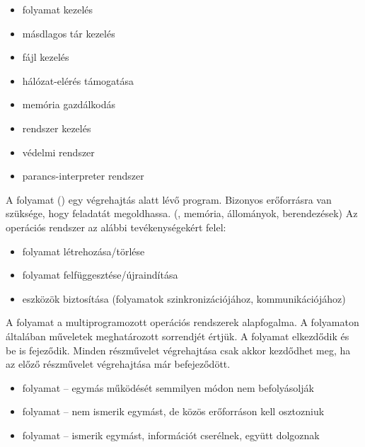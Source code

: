 \documentclass[main.tex]{subfiles}
\begin{document}
  \begin{minipage}[t]{0.5\textwidth}
    \begin{itemize}
      \item folyamat kezelés
      \item másdlagos tár kezelés
      \item fájl kezelés
      \item hálózat-elérés támogatása
    \end{itemize}
  \end{minipage}\hfill
  \begin{minipage}[t]{0.5\textwidth}
    \begin{itemize}
      \item memória gazdálkodás
      \item {} rendszer kezelés
      \item védelmi rendszer
      \item parancs-interpreter rendszer
    \end{itemize}
  \end{minipage}\hfill
  


  A folyamat () egy végrehajtás alatt lévő program.
  Bizonyos erőforrásra van szüksége, hogy feladatát megoldhassa.
  (, memória, állományok,  berendezések)
  Az operációs rendszer az alábbi tevékenységekért felel:
  \begin{itemize}
    \item folyamat létrehozása/törlése
    \item folyamat felfüggesztése/újraindítása
    \item eszközök biztosítása
    (folyamatok szinkronizációjához, kommunikációjához)
  \end{itemize}
  A folyamat a multiprogramozott operációs rendszerek alapfogalma.
  A folyamaton általában műveletek meghatározott sorrendjét értjük.
  A folyamat elkezdődik és be is fejeződik.
  Minden részművelet végrehajtása csak akkor kezdődhet meg,
  ha az előző részművelet végrehajtása már befejeződött.
  \begin{itemize}
    \item {} folyamat
    \tabto{4.6cm} – \tabto{5.2cm}
    egymás működését semmilyen módon nem befolyásolják

    \item {} folyamat
    \tabto{4.6cm} – \tabto{5.2cm}
    nem ismerik egymást, de közös erőforráson kell osztozniuk

    \item {} folyamat
    \tabto{4.6cm} – \tabto{5.2cm}
    ismerik egymást, információt cserélnek, együtt dolgoznak
  \end{itemize}
\end{document}

